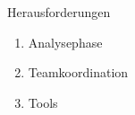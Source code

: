 \begin{frame}{Herausforderungen}{}
  \Large
	\begin{enumerate}
	  \item Analysephase
	  \item Teamkoordination
	  \item Tools
	\end{enumerate}
\end{frame}
